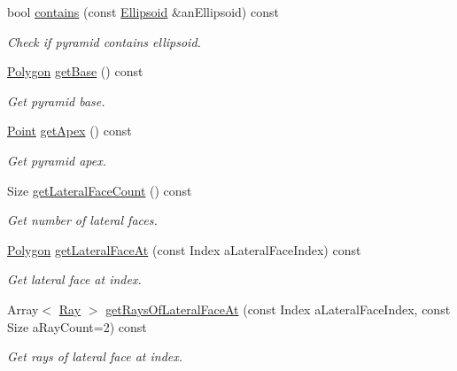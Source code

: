 \begin{DoxyCompactItemize}
bool \hyperlink{classostk_1_1math_1_1geom_1_1d3_1_1objects_1_1_pyramid_a761592bada278f4a80f910e3e234fde8}{contains} (const \hyperlink{classostk_1_1math_1_1geom_1_1d3_1_1objects_1_1_ellipsoid}{Ellipsoid} \&an\+Ellipsoid) const
\begin{DoxyCompactList}\small\item\em Check if pyramid contains ellipsoid. \end{DoxyCompactList}\item 
\hyperlink{classostk_1_1math_1_1geom_1_1d3_1_1objects_1_1_polygon}{Polygon} \hyperlink{classostk_1_1math_1_1geom_1_1d3_1_1objects_1_1_pyramid_ae1f35fb024a1cd171b750170cb1df0a4}{get\+Base} () const
\begin{DoxyCompactList}\small\item\em Get pyramid base. \end{DoxyCompactList}\item 
\hyperlink{classostk_1_1math_1_1geom_1_1d3_1_1objects_1_1_point}{Point} \hyperlink{classostk_1_1math_1_1geom_1_1d3_1_1objects_1_1_pyramid_acbc557f7d8bbfe1fc3f59fdad16684a3}{get\+Apex} () const
\begin{DoxyCompactList}\small\item\em Get pyramid apex. \end{DoxyCompactList}\item 
Size \hyperlink{classostk_1_1math_1_1geom_1_1d3_1_1objects_1_1_pyramid_af853f40f9b9501c7fcad30337d646c4c}{get\+Lateral\+Face\+Count} () const
\begin{DoxyCompactList}\small\item\em Get number of lateral faces. \end{DoxyCompactList}\item 
\hyperlink{classostk_1_1math_1_1geom_1_1d3_1_1objects_1_1_polygon}{Polygon} \hyperlink{classostk_1_1math_1_1geom_1_1d3_1_1objects_1_1_pyramid_a5c29f2b5915fbcf7a200b49840805c86}{get\+Lateral\+Face\+At} (const Index a\+Lateral\+Face\+Index) const
\begin{DoxyCompactList}\small\item\em Get lateral face at index. \end{DoxyCompactList}\item 
Array$<$ \hyperlink{classostk_1_1math_1_1geom_1_1d3_1_1objects_1_1_ray}{Ray} $>$ \hyperlink{classostk_1_1math_1_1geom_1_1d3_1_1objects_1_1_pyramid_a798481e060dc0af1ed8ed57a75d8fa9b}{get\+Rays\+Of\+Lateral\+Face\+At} (const Index a\+Lateral\+Face\+Index, const Size a\+Ray\+Count=2) const
\begin{DoxyCompactList}\small\item\em Get rays of lateral face at index. \end{DoxyCompactList}\item 

\end{DoxyCompactItemize}

